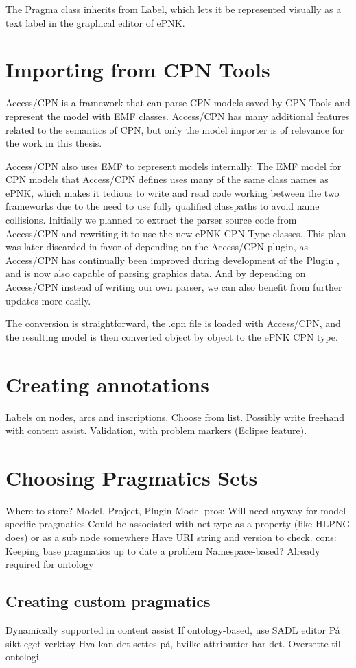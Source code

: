 
The Pragma class inherits from Label, which lets it be represented visually as a
text label in the graphical editor of ePNK.

\section{Importing from CPN Tools}
Access/CPN is a framework that can parse CPN models saved by CPN Tools and
represent the model with EMF classes. Access/CPN has many additional features
related to the semantics of CPN, but only the model importer is of relevance for
the work in this thesis.

Access/CPN also uses EMF to represent models internally. The EMF model for CPN
models that Access/CPN defines uses many of the same class names as ePNK, which
makes it tedious to write and read code working between the two frameworks due
to the need to use fully qualified classpaths to avoid name collisions.
Initially we planned to extract the parser source code from Access/CPN and
rewriting it to use the new ePNK CPN Type classes. This plan was later discarded in
favor of depending on the Access/CPN plugin, as Access/CPN has continually been
improved during development of the Plugin , and is now also
capable of parsing graphics data. And by depending on Access/CPN instead of writing
our own parser, we can also benefit from further updates more easily.

The conversion is straightforward, the .cpn file is loaded with Access/CPN,
and the resulting model is then converted object by object to the ePNK CPN type.

\section{Creating annotations}
Labels on nodes, arcs and inscriptions. 
Choose from list. Possibly write freehand with content assist. Validation, with
problem markers (Eclipse feature).

\section{Choosing Pragmatics Sets}
Where to store? Model, Project, Plugin
Model pros:
	Will need anyway for model-specific pragmatics
	Could be associated with net type as a property (like HLPNG does) or as a sub
	node somewhere
	Have URI string and version to check.
cons:
	Keeping base pragmatics up to date a problem
Namespace-based? Already required for ontology


	\subsection{Creating custom pragmatics}
	Dynamically supported in content assist 
	If ontology-based, use SADL editor
	På sikt eget verktøy
		Hva kan det settes på, hvilke attributter har det.
		Oversette til ontologi

